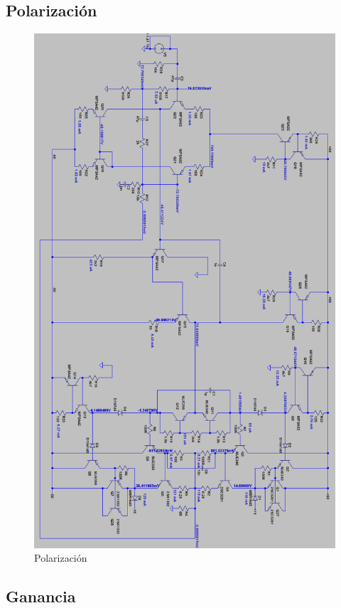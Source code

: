 \documentclass[a4paper,12pt,twoside]{article}
\begin{document}
\subsection{Polarización}
\begin{figure}[H]
	\centering
	\includegraphics[scale=0.65]{img/polarizacion}
	\caption{Polarización}
	\label{fa}
\end{figure}


\subsection{Ganancia}
\end{document}
